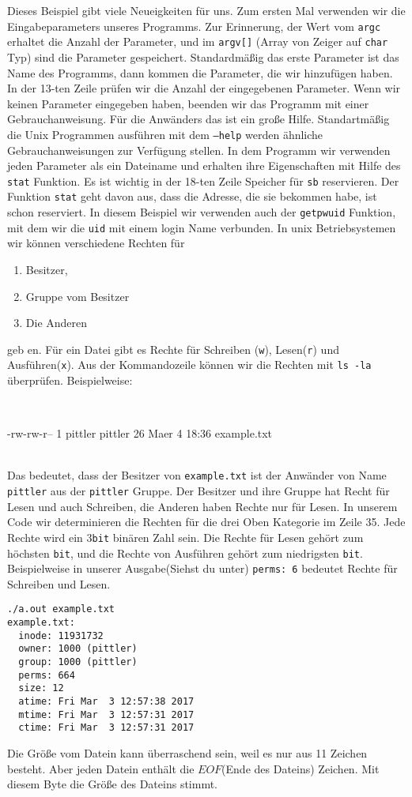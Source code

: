 Dieses Beispiel gibt  viele Neueigkeiten für uns. Zum ersten Mal verwenden wir die Eingabeparameters unseres 
Programms. Zur Erinnerung, der Wert vom \texttt{argc} erhaltet die Anzahl der Parameter, und im \texttt{argv[]} 
(Array von Zeiger auf \texttt{char} Typ) sind die Parameter gespeichert. Standardmäßig das erste Parameter ist das 
Name des Programms, dann kommen die Parameter, die wir hinzufügen haben. In der 13-ten Zeile prüfen wir die Anzahl 
der eingegebenen Parameter. Wenn wir keinen Parameter eingegeben haben, beenden wir das Programm mit einer Gebrauchanweisung.
Für die Anwänders das ist ein große Hilfe. Standartmäßig die Unix Programmen ausführen mit dem \texttt{--help} werden
ähnliche Gebrauchanweisungen zur Verfügung stellen.
In dem Programm wir verwenden jeden Parameter als ein Dateiname und erhalten ihre Eigenschaften mit Hilfe des \texttt{stat} 
Funktion. Es ist wichtig in der 18-ten Zeile Speicher für \texttt{sb} reservieren. Der Funktion \texttt{stat} geht davon aus, 
dass die Adresse, die sie bekommen habe, ist schon reserviert. In diesem Beispiel wir verwenden auch der \texttt{getpwuid} Funktion, 
mit dem wir die \texttt{uid} mit einem login Name verbunden. In unix Betriebsystemen wir können verschiedene Rechten für 
\begin{enumerate}
\item Besitzer, 
\item Gruppe vom Besitzer
\item Die Anderen
\end{enumerate}
geb en. Für ein Datei gibt es Rechte für Schreiben (\texttt{w}), Lesen(\texttt{r}) und Ausführen(\texttt{x}). Aus der Kommandozeile
können wir die Rechten mit \texttt{ls -la} überprüfen. Beispielweise:\\
\\
\begin{verb}
-rw-rw-r-- 1 pittler pittler 26 Maer  4 18:36 example.txt
\end{verb}\\
Das bedeutet, dass der Besitzer von \texttt{example.txt} ist der Anwänder von Name \texttt{pittler} aus der \texttt{pittler} Gruppe.
Der Besitzer und ihre Gruppe hat Recht für Lesen und auch Schreiben, die Anderen haben Rechte nur für Lesen.
In unserem Code wir determinieren die Rechten für die drei Oben Kategorie im Zeile 35. Jede Rechte wird ein 3\texttt{bit} binären
Zahl sein. Die Rechte für Lesen gehört zum höchsten \texttt{bit}, und die Rechte von Ausführen gehört zum niedrigsten \texttt{bit}. 
Beispielweise in unserer Ausgabe(Siehst du unter) \texttt{perms: 6} bedeutet Rechte für Schreiben und Lesen.
\begin{verbatim}
./a.out example.txt
example.txt:
  inode: 11931732
  owner: 1000 (pittler)
  group: 1000 (pittler)
  perms: 664
  size: 12
  atime: Fri Mar  3 12:57:38 2017
  mtime: Fri Mar  3 12:57:31 2017
  ctime: Fri Mar  3 12:57:31 2017
\end{verbatim}
Die Größe vom Datein kann überraschend sein, weil es nur aus 11 Zeichen besteht. Aber jeden Datein enthält die 
$EOF$(Ende des Dateins) Zeichen. Mit diesem Byte die Größe des Dateins stimmt.

